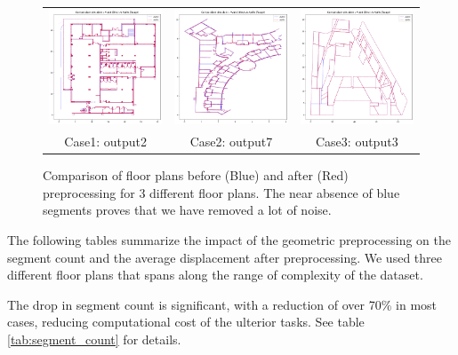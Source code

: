 \documentclass[11pt]{article}
\begin{document}
\begin{figure}[h]
    \centering
    \begin{tabular}{ccc}
        \includegraphics[width=0.32\linewidth]{figures/avant_apres_pretraitement2.png}
        &
        \includegraphics[width=0.32\linewidth]{figures/avant_apres_pretraitement7.png}
        &
        \includegraphics[width=0.32\linewidth]{figures/avant_apres_pretraitement3.png}
        \\
        Case1: output2 & Case2: output7 & Case3: output3 
    \end{tabular}

    \caption{Comparison of floor plans before (Blue) and after (Red) preprocessing 
    for 3 different floor plans. The near absence of blue segments proves that
    we have removed a lot of noise.}
    \label{fig:geojson_comparison}
\end{figure}
The following tables summarize the impact of the geometric preprocessing on the
segment count and the average displacement after preprocessing. We used three 
different floor plans that spans along the range of complexity of the dataset.

The drop in segment count is significant, with a reduction of over 70\% in most cases, 
reducing computational cost of the ulterior tasks. See table \ref{tab:segment_count} for details.
\end{document}
